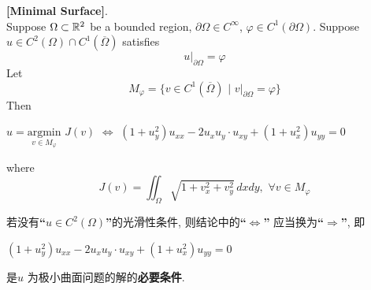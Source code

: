 	\begin{thm}\label{thm A.1.2}
		\textbf{[Minimal Surface]}. \\
		Suppose $\Omega \subset \mathbb{R}^2$ be a bounded region, $\partial \Omega \in C^{\infty}$, $\varphi \in C^1(\partial \Omega)$. Suppose $u \in C^2(\Omega) \cap C^1(\overline{\Omega})$ satisfies 
		\[ u \Big|_{\partial \Omega} = \varphi \]
		Let
		\[ M_{\varphi} = \Big\{ v \in C^1(\overline{\Omega}) \,\, \Big| \,\, v \big|_{\partial \Omega} = \varphi \Big\} \]
		Then 
		\begin{center}
			$u = \underset{v \in M_{\varphi}}{\text{argmin}} \,\, J(v) \,\, \Longleftrightarrow \,\, (1 + u_{y}^2) u_{xx} - 2 u_{x} u_{y} \cdot u_{xy} + (1 + u_{x}^2) u_{yy} = 0$
		\end{center}
		where
		\[ J(v) = \iint_{\Omega} \sqrt{1 + v_{x}^2 + v_{y}^2} \, dxdy , \,\, \forall v \in M_{\varphi} \]
			
		\vspace*{6em}
		
		\begin{rmk}
			若没有\textbf{“$u \in C^2(\Omega)$”}的光滑性条件, 则结论中的\textbf{“$\Leftrightarrow$”} 应当换为\textbf{“$\Rightarrow$”}, 即
			\begin{center}
				$(1 + u_{y}^2) u_{xx} - 2 u_{x} u_{y} \cdot u_{xy} + (1 + u_{x}^2) u_{yy} = 0$
			\end{center}
			是$u$ 为极小曲面问题的解的\textbf{必要条件}. 
		\end{rmk}
		
		\vspace*{6em}
		

\end{thm}
